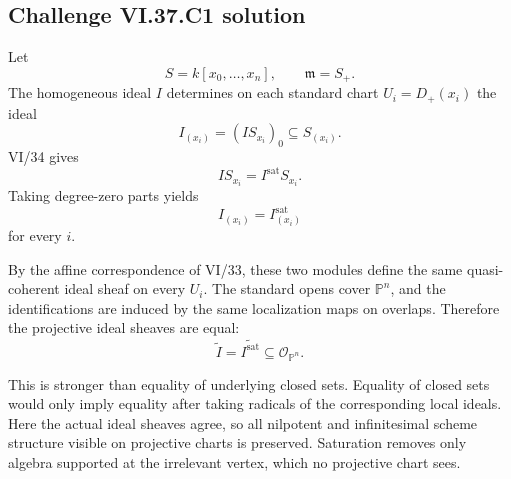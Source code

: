 
\subsection*{Challenge VI.37.C1 solution}
\begin{solution}
Let
\[
S=k[x_0,\ldots,x_n],\qquad \mathfrak m=S_+.
\]
The homogeneous ideal \(I\) determines on each standard chart \(U_i=D_+(x_i)\) the ideal
\[
I_{(x_i)}=(IS_{x_i})_0\subseteq S_{(x_i)}.
\]
VI/34 gives
\[
IS_{x_i}=I^{\mathrm{sat}}S_{x_i}.
\]
Taking degree-zero parts yields
\[
\boxed{
I_{(x_i)}
=
I^{\mathrm{sat}}_{(x_i)}
}
\]
for every \(i\).

By the affine correspondence of VI/33, these two modules define the same quasi-coherent ideal sheaf on every \(U_i\). The standard opens cover \(\mathbb P^n\), and the identifications are induced by the same localization maps on overlaps. Therefore the projective ideal sheaves are equal:
\[
\boxed{
\widetilde I=\widetilde{I^{\mathrm{sat}}}
\subseteq\mathcal O_{\mathbb P^n}.
}
\]

This is stronger than equality of underlying closed sets. Equality of closed sets would only imply equality after taking radicals of the corresponding local ideals. Here the actual ideal sheaves agree, so all nilpotent and infinitesimal scheme structure visible on projective charts is preserved. Saturation removes only algebra supported at the irrelevant vertex, which no projective chart sees.
\end{solution}

